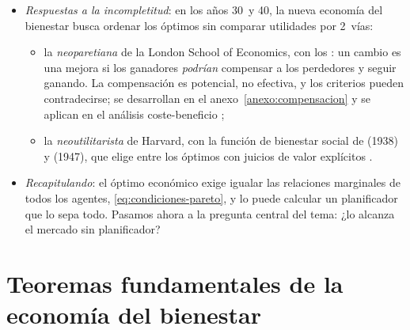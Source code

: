 \documentclass[11pt]{article}
\begin{document}
\begin{itemize}
\begin{enumerate}
  \item \emph{es incompleto}, posiblemente su principal inconveniente: no ordena los infinitos óptimos de la GFPU, ni permite comparar un punto eficiente con uno ineficiente que no esté por debajo y a la izquierda de él.\footnote{ llama \emph{máximo de ofelimidad} a la optimalidad que alcanza la competencia; , en sus reseñas de \nocite{Wicksell1958Selected}, le reprocha confundirla con el óptimo social: hay infinitos óptimos, y el equilibrio competitivo no tiene por qué ser el socialmente preferido.}
  \end{enumerate}
\item \emph{Respuestas a la incompletitud}: en los años 30~y 40, la nueva economía del bienestar busca ordenar los óptimos sin comparar utilidades por 2~vías:
  \begin{itemize}
  \item la \emph{neoparetiana} de la London School of Economics, con los : un cambio es una mejora si los ganadores \emph{podrían} compensar a los perdedores y seguir ganando\nocite{Kaldor1939Welfare,Hicks1939Foundations}. La compensación es potencial, no efectiva, y los criterios pueden contradecirse\nocite{Scitovsky1941Note}; se desarrollan en el anexo~\ref{anexo:compensacion} y se aplican en el análisis coste-beneficio ;
  \item la \emph{neoutilitarista} de Harvard, con la función de bienestar social de  (1938) y  (1947), que elige entre los óptimos con juicios de valor explícitos .
  \end{itemize}
\item \emph{Recapitulando}: el óptimo económico exige igualar las relaciones marginales de todos los agentes, \eqref{eq:condiciones-pareto}, y lo puede calcular un planificador que lo sepa todo. Pasamos ahora a la pregunta central del tema: ¿lo alcanza el mercado sin planificador?
\end{itemize}


\section{Teoremas fundamentales de la economía del bienestar}\label{sec:teoremas}
\end{document}
